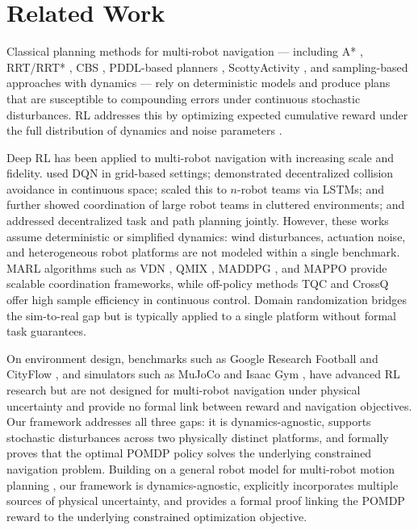 \documentclass{article}
\begin{document}
\section{Related Work}
\label{sec:recent}
 
Classical planning methods for multi-robot navigation — including A* \citep{goto2003}, RRT/RRT* \citep{rodriguez2006rrt, karaman2011rrts}, CBS \citep{sharon2015cbs, li2019mccbs}, PDDL-based planners \citep{fox2003pddl21, coles2010popf, benton2012optic}, ScottyActivity \citep{fernandez2018scottyactivity}, and sampling-based approaches with dynamics \citep{le2017icaps, le2019ral, le2021icra, bui2022iros} — rely on deterministic models and produce plans that are susceptible to compounding errors under continuous stochastic disturbances. RL addresses this by optimizing expected cumulative reward under the full distribution of dynamics and noise parameters \citep{reda2020learning, dulacArnold2021, ibarz2021ijrr, tang2025}.
 
Deep RL has been applied to multi-robot navigation with increasing scale and fidelity. \citet{bae2019as} used DQN in grid-based settings; \citet{chen2017icra} demonstrated decentralized collision avoidance in continuous space; \citet{everett2018iros} scaled this to $n$-robot teams via LSTMs; \citet{long2017iral} and \citet{fan2020ijrr} further showed coordination of large robot teams in cluttered environments; and \citet{chen2021iral} addressed decentralized task and path planning jointly. However, these works assume deterministic or simplified dynamics: wind disturbances, actuation noise, and heterogeneous robot platforms are not modeled within a single benchmark. MARL algorithms such as VDN \citep{sunehag2018vdn}, QMIX \citep{rashid2018qmix}, MADDPG \citep{lowe2017maddpg}, and MAPPO \citep{yu2022mappo} provide scalable coordination frameworks, while off-policy methods TQC \citep{kuznetsov2020tqc} and CrossQ \citep{bhatt2024crossq} offer high sample efficiency in continuous control. Domain randomization \citep{tobin2017domain, peng2018sim2real} bridges the sim-to-real gap but is typically applied to a single platform without formal task guarantees.
 
On environment design, benchmarks such as Google Research Football \citep{kurach2020google} and CityFlow \citep{zhang2019cityflow}, and simulators such as MuJoCo \citep{todorov2012mujoco} and Isaac Gym \citep{makoviychuk2021isaac}, have advanced RL research \citep{henderson2018deep, reda2020learning, dulac2020empirical} but are not designed for multi-robot navigation under physical uncertainty and provide no formal link between reward and navigation objectives. Our framework addresses all three gaps: it is dynamics-agnostic, supports stochastic disturbances across two physically distinct platforms, and formally proves that the optimal POMDP policy solves the underlying constrained navigation problem. Building on a general robot model for multi-robot motion planning \citep{le2021icra}, our framework is dynamics-agnostic, explicitly incorporates multiple sources of physical uncertainty, and provides a formal proof linking the POMDP reward to the underlying constrained optimization objective.
\end{document}
